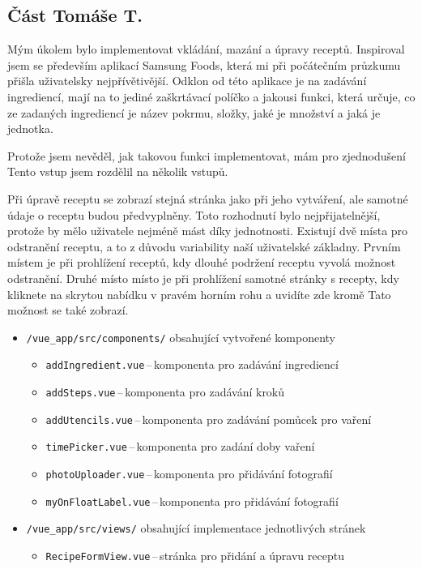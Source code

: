 \documentclass[a4paper, 11pt]{article}
\renewcommand{\t}[1]{\texttt{#1}} %
\begin{document}
\subsection{Část Tomáše T.}

Mým úkolem bylo implementovat vkládání, mazání a úpravy receptů. Inspiroval jsem se především 
aplikací Samsung Foods, která mi při počátečním průzkumu přišla uživatelsky nejpřívětivější. Odklon od této aplikace je na
zadávání ingrediencí, mají na to jediné zaškrtávací políčko a jakousi funkci, která určuje, co ze zadaných ingrediencí je název pokrmu,
složky, jaké je množství a jaká je jednotka.

Protože jsem nevěděl, jak takovou funkci implementovat, mám pro zjednodušení
Tento vstup jsem rozdělil na několik vstupů.

Při úpravě receptu se zobrazí stejná stránka jako při jeho vytváření, ale
samotné údaje o receptu budou předvyplněny. Toto rozhodnutí bylo nejpřijatelnější, protože by mělo uživatele nejméně mást
díky jednotnosti. Existují dvě místa pro odstranění receptu, a to z důvodu variability naší uživatelské základny.
Prvním místem je při prohlížení receptů, kdy dlouhé podržení receptu vyvolá možnost odstranění. Druhé místo 
místo je při prohlížení samotné stránky s recepty, kdy kliknete na skrytou nabídku v pravém horním rohu a uvidíte zde kromě
Tato možnost se také zobrazí.

\begin{itemize}
    \item \t{/vue\_app/src/components/} obsahující vytvořené komponenty
        \begin{itemize}
            \item \t{addIngredient.vue}\,--\,komponenta pro zadávání ingrediencí
            \item \t{addSteps.vue}\,--\,komponenta pro zadávání kroků
            \item \t{addUtencils.vue}\,--\,komponenta pro zadávání pomůcek pro vaření
            \item \t{timePicker.vue}\,--\,komponenta pro zadání doby vaření
            \item \t{photoUploader.vue}\,--\,komponenta pro přidávání fotografií
            \item \t{myOnFloatLabel.vue}\,--\,komponenta pro přidávání fotografií
        \end{itemize}
    \item \t{/vue\_app/src/views/} obsahující implementace jednotlivých stránek
        \begin{itemize}
            \item \t{RecipeFormView.vue}\,--\,stránka pro přidání a úpravu receptu
        \end{itemize}
\end{itemize}
\end{document}
